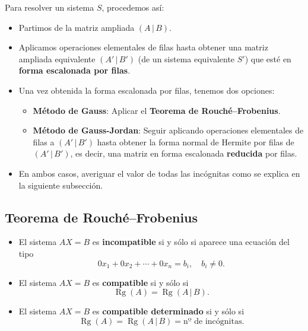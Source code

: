 \documentclass[a4paper,12pt]{article}
\begin{document}
\begin{procedimiento}[title=Resolución de sistemas por Métodos de Gauss y Gauss-Jordan]

Para resolver un sistema $S$, procedemos así:
\begin{itemize}
    \item Partimos de la matriz ampliada $(A\,|\,B)$.
    \item Aplicamos operaciones elementales de filas hasta obtener una matriz ampliada equivalente $(A'\,|\,B')$ (de un sistema equivalente $S'$) que esté en \textbf{forma escalonada por filas}.
    \item Una vez obtenida la forma escalonada por filas, tenemos dos opciones:
    \begin{itemize}
        \item \textbf{Método de Gauss}: Aplicar el \textbf{Teorema de Rouché--Frobenius}.
        \item \textbf{Método de Gauss-Jordan}: Seguir aplicando operaciones elementales de filas a $(A'\,|\,B')$ hasta obtener la forma normal de Hermite por filas de $(A'\,|\,B')$, es decir, una matriz en forma escalonada \textbf{reducida} por filas.
    \end{itemize}
    \item En ambos casos, averiguar el valor de todas las incógnitas como se explica en la siguiente subsección.
\end{itemize}
\end{procedimiento}

\subsection{Teorema de Rouché--Frobenius}

\begin{procedimiento}[title=Teorema de Rouché--Frobenius]
    
\begin{itemize}
    \item[1)] El sistema $A X = B$ es \textbf{incompatible} si y sólo si aparece una ecuación del tipo  
    \[
    0x_1 + 0x_2 + \cdots + 0x_n = b_i,\quad b_i \neq 0.
    \]

    \item[2)] El sistema $A X = B$ es \textbf{compatible} si y sólo si 
    \[
    \operatorname{Rg}(A) = \operatorname{Rg}(A\,|\,B).
    \]

    \item[3)] El sistema $A X = B$ es \textbf{compatible determinado} si y sólo si 
    \[
    \operatorname{Rg}(A) = \operatorname{Rg}(A\,|\,B) = \text{nº de incógnitas}.
    \]
\end{itemize}

\end{procedimiento}
\end{document}

